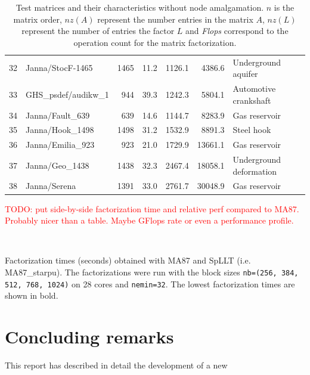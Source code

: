 \documentclass{article}
\newcommand{\alert}[1]{\textcolor{red}{#1}\xspace}
\newcommand{\TODO}[1]{\alert{TODO: #1}\xspace}
\begin{document}
\begin{table}[htbp]
\begin{center}
{\begin{tabular}{rl|rrrrl}
      32 & Janna/StocF-1465                & 1465     & 11.2     & 1126.1   & 4386.6   & Underground aquifer      \\
      33 & GHS\_psdef/audikw\_1            & 944      & 39.3     & 1242.3   & 5804.1   & Automotive crankshaft    \\
      34 & Janna/Fault\_639                & 639      & 14.6     & 1144.7   & 8283.9   & Gas reservoir            \\
      35 & Janna/Hook\_1498                & 1498     & 31.2     & 1532.9   & 8891.3   & Steel hook               \\
      36 & Janna/Emilia\_923               & 923      & 21.0     & 1729.9   & 13661.1  & Gas reservoir            \\
      37 & Janna/Geo\_1438                 & 1438     & 32.3     & 2467.4   & 18058.1  & Underground deformation  \\
      38 & Janna/Serena                    & 1391     & 33.0     & 2761.7   & 30048.9  & Gas reservoir            \\
      \hline
    \end{tabular}}
  \end{center}
  \caption{Test matrices and their characteristics without node
    amalgamation. $n$ is the matrix order, $nz(A)$ represent the
    number entries in the matrix $A$, $nz(L)$ represent the number of
    entries the factor $L$ and \textit{Flops} correspond to the operation
    count for the matrix factorization.}
\end{table}

\TODO{put side-by-side factorization time and relative perf compared
  to MA87. Probably nicer than a table. Maybe GFlops rate or even a
  performance profile.}

\begin{table}[htbp]
    \begin{center}
      \texttt{
        }
    \end{center}
    \caption{Factorization times (seconds) obtained with MA87 and
      SpLLT (i.e. MA87\_starpu). The factorizations were run with the
      block sizes \texttt{nb=(256, 384, 512, 768, 1024)} on 28 cores
      and \texttt{nemin=32}. The lowest factorization times are shown
      in bold.}
\end{table}

\section{Concluding remarks}\label{sec:conclusions}
This report has described in detail the development of a new
\end{document}
